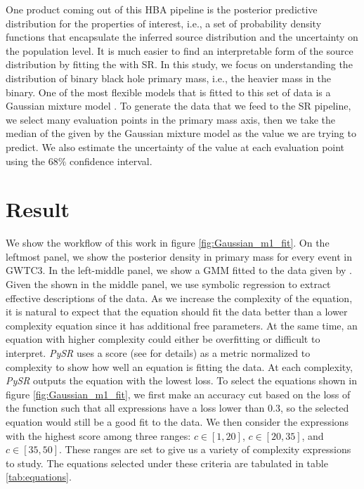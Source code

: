 \documentclass[nohyperref]{article}
\newcommand\pysr{\textit{PySR}\xspace}
\theoremstyle{plain}
\theoremstyle{definition}
\theoremstyle{remark}
\begin{document}
One product coming out of this HBA pipeline is the posterior predictive distribution  for the properties of interest, i.e., a set of probability density functions that encapsulate the inferred source distribution and the uncertainty on the population level.
It is much easier to find an interpretable form of the source distribution by fitting the \ppd with SR.
In this study, we focus on understanding the distribution of binary black hole primary mass, i.e., the heavier mass in the binary.
One of the most flexible models that is fitted to this set of data is a Gaussian mixture model \cite{Tiwari:2020vym}.
To generate the data that we feed to the SR pipeline,
we select many evaluation points in the primary mass axis,
then we take the median of the \ppd given by the Gaussian mixture model as the value we are trying to predict.
We also estimate the uncertainty of the value at each evaluation point using the $68\%$ confidence interval.

\section{Result}
\label{sec:result}

We show the workflow of this work in figure \ref{fig:Gaussian_m1_fit}.
On the leftmost panel, we show the posterior density in primary mass for every event in GWTC3.
In the left-middle panel, we show a GMM fitted to the data given by \cite{Tiwari:2020vym}.
Given the \ppd shown in the middle panel, we use symbolic regression to extract effective descriptions of the data. 
As we increase the complexity of the equation, it is natural to expect that the equation should fit the data better than a lower complexity equation since it has additional free parameters.
At the same time, an equation with higher complexity could either be overfitting or difficult to interpret.
\pysr uses a score (see \citealt{cranmerDiscoveringSymbolicModels2020} for details) as a metric normalized to complexity to show how well an equation is fitting the data.
At each complexity, \pysr outputs the equation with the lowest loss.
To select the equations shown in figure \ref{fig:Gaussian_m1_fit}, we first make an accuracy cut based on the loss of the function such that all expressions have a loss lower than $0.3$, so the selected equation would still be a good fit to the data.
We then consider the expressions with the highest score among three ranges: $c\in [1, 20]$,
$c\in[20, 35]$, and $c\in[35, 50]$.
These ranges are set to give us a variety of complexity expressions to study.
The equations selected under these criteria are tabulated in table \ref{tab:equations}.
\end{document}
